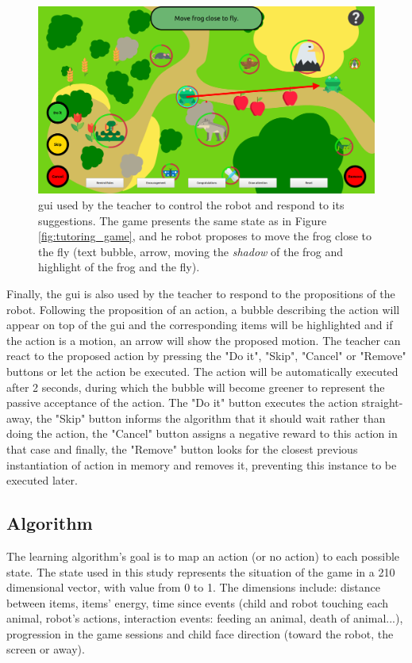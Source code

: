 \begin{figure}[ht]
	\centering
	\includegraphics[width=1\textwidth]{gui.png}
	\captionsetup{width=.9\linewidth}
	\caption{\gls{gui} used by the teacher to control the robot and respond to its suggestions. The game presents the same state as in Figure \ref{fig:tutoring_game}, and he robot proposes to move the frog close to the fly (text bubble, arrow, moving the \textit{shadow} of the frog and highlight of the frog and the fly).}
	\label{fig:tutoring_gui}
\end{figure}


Finally, the \gls{gui} is also used by the teacher to respond to the propositions of the robot. Following the proposition of an action, a bubble describing the action will appear on top of the \gls{gui} and the corresponding items will be highlighted and if the action is a motion, an arrow will show the proposed motion. The teacher can react to the proposed action by pressing the "Do it", "Skip", "Cancel" or "Remove" buttons or let the action be executed. The action will be automatically executed after 2 seconds, during which the bubble will become greener to represent the passive acceptance of the action. The "Do it" button executes the action straight-away, the "Skip" button informs the algorithm that it should wait rather than doing the action, the "Cancel" button assigns a negative reward to this action in that case and finally, the "Remove" button looks for the closest previous instantiation of action in memory and removes it, preventing this instance to be executed later.

\subsection{Algorithm}

The learning algorithm's goal is to map an action (or no action) to each possible state. The state used in this study represents the situation of the game in a 210 dimensional vector, with value from 0 to 1. The dimensions include: distance between items, items' energy, time since events (child and robot touching each animal, robot's actions, interaction events: feeding an animal, death of animal...), progression in the game sessions and child face direction (toward the robot, the screen or away).

